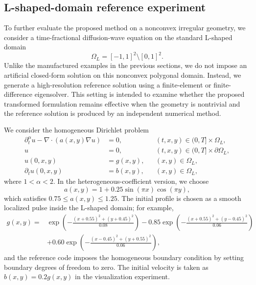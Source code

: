 
\subsection{L-shaped-domain reference experiment}
\label{subsec:lshape-reference}

To further evaluate the proposed method on a nonconvex irregular geometry, we consider a time-fractional diffusion-wave equation on the standard L-shaped domain
\begin{equation}
    \Omega_L = [-1,1]^2 \setminus [0,1]^2 .
\end{equation}
Unlike the manufactured examples in the previous sections, we do not impose an artificial closed-form solution on this nonconvex polygonal domain.  Instead, we generate a high-resolution reference solution using a finite-element or finite-difference eigensolver.  This setting is intended to examine whether the proposed transformed formulation remains effective when the geometry is nontrivial and the reference solution is produced by an independent numerical method.

We consider the homogeneous Dirichlet problem
\begin{equation}
\begin{aligned}
    \partial_t^\alpha u - \nabla\cdot(a(x,y)\nabla u) &= 0,
        && (t,x,y)\in(0,T]\times\Omega_L, \\
    u &= 0,
        && (t,x,y)\in(0,T]\times\partial\Omega_L, \\
    u(0,x,y) &= g(x,y),
        && (x,y)\in\Omega_L, \\
    \partial_t u(0,x,y) &= b(x,y),
        && (x,y)\in\Omega_L,
\end{aligned}
\label{eq:lshape-fdw}
\end{equation}
where $1<\alpha<2$.  In the heterogeneous-coefficient version, we choose
\begin{equation}
    a(x,y)=1+0.25\sin(\pi x)\cos(\pi y),
\end{equation}
which satisfies $0.75\le a(x,y)\le 1.25$.  The initial profile is chosen as a smooth localized pulse inside the L-shaped domain; for example,
\begin{equation}
\begin{aligned}
    g(x,y) ={}& \exp\left(-\frac{(x+0.55)^2+(y+0.45)^2}{0.08}\right)
    -0.85\exp\left(-\frac{(x+0.55)^2+(y-0.45)^2}{0.06}\right) \\
    &+0.60\exp\left(-\frac{(x-0.45)^2+(y+0.55)^2}{0.06}\right),
\end{aligned}
\end{equation}
and the reference code imposes the homogeneous boundary condition by setting boundary degrees of freedom to zero.  The initial velocity is taken as $b(x,y)=0.2g(x,y)$ in the visualization experiment.

